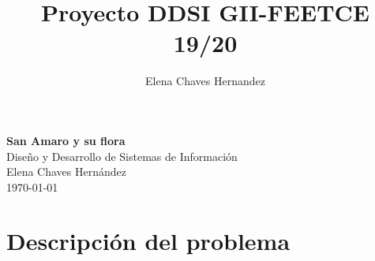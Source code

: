 \documentclass[10pt,a4paper]{article}
\author{Elena Chaves Hernandez}
\title{Proyecto DDSI GII-FEETCE 19/20}
\begin{document}
\renewcommand{\contentsname}{Contenidos}
\renewcommand{\refname}{Bibliografía}

\begin{titlepage}
\thispagestyle{empty}
\setlength{\unitlength}{1cm}
\vspace*{\fill}

\begin{center}
\textbf{{\Huge San Amaro y su flora}}\\\vspace{7.5cm}
{\Large Diseño y Desarrollo de Sistemas de Información}\\\vspace{1cm}
{\Large Elena Chaves Hernández}\\\vspace{1cm}
\today \vspace{1cm}

\begin{figure} [h!]
\end{figure}
\end{center}
\end{titlepage}


\newpage
\tableofcontents
\thispagestyle{empty} 
\newpage

\section{\textbf{Descripción del problema}}  
\end{document}

